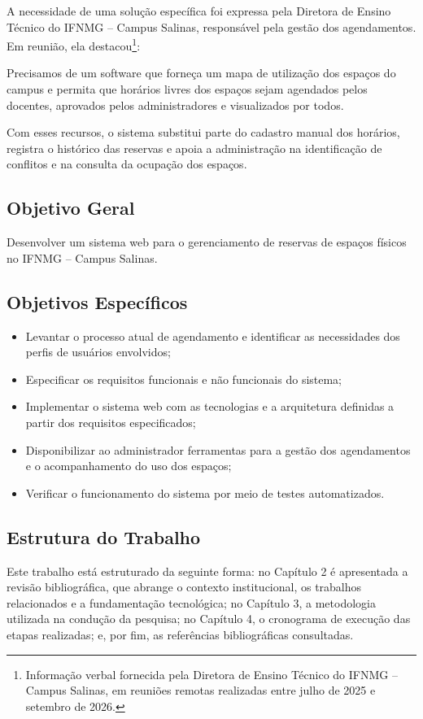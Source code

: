 \documentclass[
	12pt,				%
	twoside,			%
	openany,			%
	a4paper,			%
	chapter=TITLE,		%
	section=TITLE,		%
	subsection=TITLE,	%
	subsubsection=TITLE,%
	english,			%
	french,				%
	spanish,			%
	brazil,				%
	]{abntex2}
\begin{document}
A necessidade de uma solução específica foi expressa pela Diretora de Ensino Técnico do IFNMG -- Campus Salinas, responsável pela gestão dos agendamentos. Em reunião, ela destacou\footnote{Informação verbal fornecida pela Diretora de Ensino Técnico do IFNMG -- Campus Salinas, em reuniões remotas realizadas entre julho de 2025 e setembro de 2026.}:

\begin{citacao}
Precisamos de um software que forneça um mapa de utilização dos espaços do campus e permita que horários livres dos espaços sejam agendados pelos docentes, aprovados pelos administradores e visualizados por todos.
\end{citacao}

Com esses recursos, o sistema substitui parte do cadastro manual dos horários, registra o histórico das reservas e apoia a administração na identificação de conflitos e na consulta da ocupação dos espaços.
\subsection{Objetivo Geral}
\label{sec:objetivoGeral}
Desenvolver um sistema web para o gerenciamento de reservas de espaços físicos no IFNMG -- Campus Salinas.
\subsection{Objetivos Específicos}
\label{sec:objetivosEspecificos}
\begin{itemize}
    \item Levantar o processo atual de agendamento e identificar as necessidades dos perfis de usuários envolvidos;
    \item Especificar os requisitos funcionais e não funcionais do sistema;
    \item Implementar o sistema web com as tecnologias e a arquitetura definidas a partir dos requisitos especificados;
    \item Disponibilizar ao administrador ferramentas para a gestão dos agendamentos e o acompanhamento do uso dos espaços;
    \item Verificar o funcionamento do sistema por meio de testes automatizados.
\end{itemize}
\subsection{Estrutura do Trabalho}
Este trabalho está estruturado da seguinte forma: no Capítulo 2 é apresentada a revisão bibliográfica, que abrange o contexto institucional, os trabalhos relacionados e a fundamentação tecnológica; no Capítulo 3, a metodologia utilizada na condução da pesquisa; no Capítulo 4, o cronograma de execução das etapas realizadas; e, por fim, as referências bibliográficas consultadas.
\end{document}
